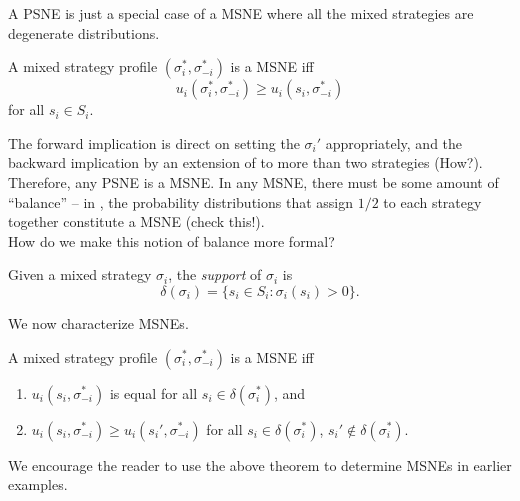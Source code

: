 	A PSNE is just a special case of a MSNE where all the mixed strategies are degenerate distributions.

	\begin{ftheo}
		\label{theo: for msne suffices to check pure deviations}
		A mixed strategy profile $(\sigma_i^*,\sigma_{-i}^*)$ is a MSNE iff
		\[ u_i(\sigma_i^*,\sigma_{-i}^*) \ge u_i(s_i,\sigma_{-i}^*) \]
		for all $s_i \in S_i$.
	\end{ftheo}
	The forward implication is direct on setting the $\sigma_i'$ appropriately, and the backward implication by an extension of  to more than two strategies (How?).\\

	Therefore, any PSNE is a MSNE. In any MSNE, there must be some amount of ``balance'' -- in , the probability distributions that assign $1/2$ to each strategy together constitute a MSNE (check this!).\\
	How do we make this notion of balance more formal?

	\begin{definition}
		Given a mixed strategy $\sigma_i$, the \emph{support} of $\sigma_i$ is
		\[ \delta(\sigma_i) = \{ s_i \in S_i : \sigma_i(s_i) > 0 \}. \]
	\end{definition}

	We now characterize MSNEs.

	\begin{ftheo}
		A mixed strategy profile $(\sigma_i^*,\sigma_{-i}^*)$ is a MSNE iff
		\begin{enumerate}[label=(\alph*)]
			\item $u_i(s_i,\sigma_{-i}^*)$ is equal for all $s_i \in \delta(\sigma_i^*)$, and
			\item $u_i(s_i,\sigma_{-i}^*) \ge u_i(s_i',\sigma_{-i}^*)$ for all $s_i \in \delta(\sigma_i^*)$, $s_i' \not\in \delta(\sigma_i^*)$.
		\end{enumerate}
	\end{ftheo}

	We encourage the reader to use the above theorem to determine MSNEs in earlier examples.

